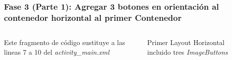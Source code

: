 \begin{frame}[fragile]
\frametitle{Fase 3 (Parte 1): Agregar 3 botones en orientaci\'on al contenedor horizontal al primer Contenedor} 
\begin{columns}

Este fragmento de c\'odigo sustituye a las lineas 7 a 10 del \textit{activity\_main.xml}
\begin{block}{Primer Layout Horizontal incluido tres \textit{ImageButtons}}
\inputminted[linenos,fontsize=\tiny]{xml}{00_CambiosInterfaz/Layout_Fase3.xml}
\end{block}
%
\begin{center}

\end{center}
\end{columns}
\end{frame}
